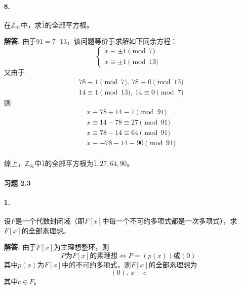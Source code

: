 \documentclass[12pt, a4paper, oneside]{ctexart}
\newenvironment{solution}{\par\noindent\textbf{解答. }}{\bigskip\par}
\begin{document}
\paragraph{8.}在$\mathbb{Z}_{91}$中，求$\bar{1}$的全部平方根。
\begin{solution}
     由于$91 = 7\cdot 13$，该问题等价于求解如下同余方程：
     \begin{equation*}
         \begin{cases}
             x\equiv \pm 1\pmod{7}\\
             x\equiv \pm 1\pmod{13}
         \end{cases}
     \end{equation*}
     又由于
     \begin{equation*}
         \begin{aligned}
            &78\equiv 1\pmod 7,\ 78\equiv 0\pmod{13}\\
            &14\equiv 1\pmod{13},\ 14\equiv 0\pmod 7
         \end{aligned}
     \end{equation*}
     则
     \begin{equation*}
        \begin{aligned}
            &x\equiv 78+14\equiv 1\pmod{91}\\
            &x\equiv 14-78\equiv 27\pmod{91}\\
            &x\equiv 78-14\equiv 64\pmod{91}\\
            &x\equiv -78-14\equiv 90\pmod{91}\\
        \end{aligned}
     \end{equation*}

     综上，$\mathbb{Z}_{91}$中$\bar{1}$的全部平方根为$\bar{1},\overline{27},\overline{64},\overline{90}$。
\end{solution}
\paragraph{习题 2.3}
\paragraph{1.} 设$F$是一个代数封闭域（即$F[x]$中每一个不可约多项式都是一次多项式），求$F[x]$的全部素理想。
\begin{solution}
    由于$F[x]$为主理想整环，则
    \begin{equation*}
        P\text{为}F[x]\text{的素理想}\iff P = (p(x))\text{或}(0)
    \end{equation*}
    其中$p(x)$为$F[x]$中的不可约多项式，则$F[x]$的全部素理想为
    \begin{equation*}
        (0),\  x+c
    \end{equation*}
    其中$c\in F$。
\end{solution}
\end{document}

